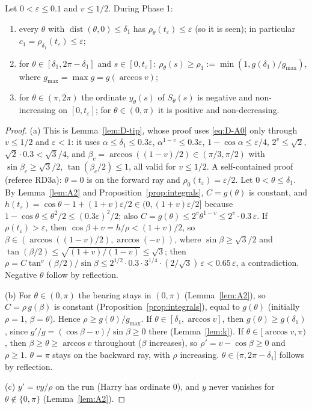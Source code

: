 \begin{lemma}[W3: phase 1]\label{lem:D3-W3}
Let $0<\varepsilon\le0.1$ and $v\le1/2$. During Phase 1:
\begin{enumerate}
\item[(a)] every $\theta$ with $\operatorname{dist}(\theta,0)\le\delta_1$ has $\rho_\theta(t_\varepsilon)\le\varepsilon$ (so it is
seen); in particular $c_1=\rho_{\delta_1}(t_\varepsilon)\le\varepsilon$;
\item[(b)] for $\theta\in[\delta_1,2\pi-\delta_1]$ and $s\in[0,t_\varepsilon]$: $\rho_\theta(s)\ge\rho_1:=\min(1,g(\delta_1)/g_{\max})$,
where $g_{\max}=\max g=g(\arccos v)$;
\item[(c)] for $\theta\in(\pi,2\pi)$ the ordinate $y_\theta(s)$ of $S_\theta(s)$ is negative and non-increasing on $[0,t_\varepsilon]$;
for $\theta\in(0,\pi)$ it is positive and non-decreasing.
\end{enumerate}
\end{lemma}
\begin{proof}
(a) This is Lemma~\ref{lem:D-tip}, whose proof uses \eqref{eq:D-A0} only through $v\le1/2$ and $\varepsilon<1$: it uses
$\alpha\le\delta_1\le0.3\varepsilon$, $\alpha^{1-v}\le0.3\varepsilon$, $1-\cos\alpha\le\varepsilon/4$, $2^v\le\sqrt2$,
$\sqrt2\cdot0.3<\sqrt3/4$, and $\beta_c=\arccos((1-v)/2)\in(\pi/3,\pi/2)$ with $\sin\beta_c\ge\sqrt3/2$, $\tan(\beta_c/2)\le1$, all
valid for $v\le1/2$. A self-contained proof (referee RD3a): $\theta=0$ is on the forward ray and $\rho_0(t_\varepsilon)=\varepsilon/2$.
Let $0<\theta\le\delta_1$. By Lemma~\ref{lem:A2} and Proposition~\ref{prop:integrals}, $C=g(\theta)$ is constant, and
$h(t_\varepsilon)=\cos\theta-1+(1+v)\varepsilon/2\in(0,(1+v)\varepsilon/2]$ because $1-\cos\theta\le\theta^2/2\le(0.3\varepsilon)^2/2$;
also $C=g(\theta)\le2^v\theta^{1-v}\le2^v\cdot0.3\,\varepsilon$. If $\rho(t_\varepsilon)>\varepsilon$, then
$\cos\beta+v=h/\rho<(1+v)/2$, so $\beta\in(\arccos((1-v)/2),\arccos(-v))$, where $\sin\beta\ge\sqrt3/2$ and
$\tan(\beta/2)\le\sqrt{(1+v)/(1-v)}\le\sqrt3$; then
$\rho=C\tan^v(\beta/2)/\sin\beta\le2^{1/2}\cdot0.3\cdot3^{1/4}\cdot(2/\sqrt3)\,\varepsilon<0.65\,\varepsilon$, a contradiction.
Negative $\theta$ follow by reflection.

(b) For $\theta\in(0,\pi)$ the bearing stays in $(0,\pi)$ (Lemma~\ref{lem:A2}), so $C=\rho\,g(\beta)$ is constant
(Proposition~\ref{prop:integrals}), equal to $g(\theta)$ (initially $\rho=1$, $\beta=\theta$). Hence $\rho\ge g(\theta)/g_{\max}$. If
$\theta\in[\delta_1,\arccos v]$, then $g(\theta)\ge g(\delta_1)$, since $g'/g=(\cos\beta-v)/\sin\beta\ge0$ there (Lemma~\ref{lem:k}). If
$\theta\in[\arccos v,\pi)$, then $\beta\ge\theta\ge\arccos v$ throughout ($\beta$ increases), so $\rho'=v-\cos\beta\ge0$ and $\rho\ge1$.
$\theta=\pi$ stays on the backward ray, with $\rho$ increasing. $\theta\in(\pi,2\pi-\delta_1]$ follows by reflection.

(c) $y'=vy/\rho$ on the run (Harry has ordinate $0$), and $y$ never vanishes for $\theta\notin\{0,\pi\}$ (Lemma~\ref{lem:A2}).
\end{proof}


